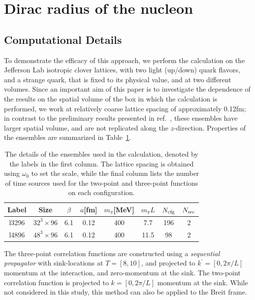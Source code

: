 \documentclass[prd,aps,twocolumn,superscriptaddress,tightenlines,nofootinbib,floatfix,preprintnumbers,10pt]{revtex4-1}
\begin{document}
\section{Dirac radius of the nucleon}\label{sec:results}

\subsection{Computational Details}
To demonstrate the efficacy of this approach, we perform the
calculation on the Jefferson Lab isotropic clover lattices, with two light
(up/down) quark flavors, and a strange quark, that is fixed to its
physical value, and at two different volumes.  Since an important aim
of this paper is to investigate the dependence of the results on the
spatial volume of the box in which the calculation is performed, we
work at relatively coarse lattice spacing of approximately 0.12fm; in contrast to the
preliminary results presented in ref.~\cite{Bouchard:2016gmc}, these
ensembles have larger spatial volume, and are not replicated along the $z$-direction.  Properties of the ensembles are summarized in Table~\ref{tab:cfg}.
\begin{table}
  \begin{tabular}{cccccccc}
  	\hline\hline
    Label & Size & $\beta$ & $a$[fm] & $m_\pi$[MeV] & $m_\pi L$ & $N_{\rm cfg}$ & $N_{\rm src}$\\
    \hline
    l3296 & $32^3 \times 96$ & 6.1 & 0.12 & 400 & 7.7 & 196 & 2\\
    l4896 & $48^3 \times 96$ & 6.1 & 0.12 & 400 & 11.5 & 98 & 2\\
    \hline\hline
  \end{tabular}
  \caption{The details of the ensembles used in the calculation, denoted by the labels in the first column.  The
    lattice spacing is obtained using $\omega_0$ to set the scale,
    while the final column lists the number of time sources used for
    the two-point and three-point functions on each
    configuration.\label{tab:cfg}}
\end{table}


The three-point correlation functions are constructed using a \textit{sequential propagator} with sink-locations at $T=[8,10]$, and projected to $k^\prime=[0,2\pi/L]$ momentum at the interaction, and zero-momentum at the sink. The two-point correlation function is projected to $k=[0,2\pi/L]$ momentum at the sink. While not considered in this study, this method can also be applied to the Breit frame.
\end{document}
